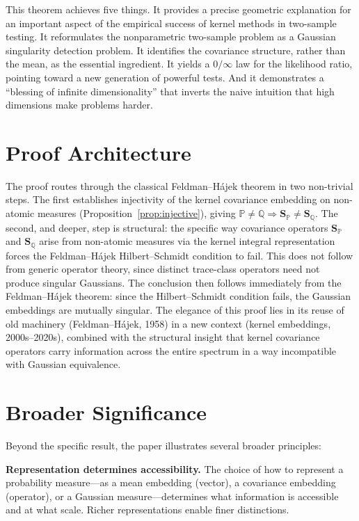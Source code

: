 \documentclass[12pt, oneside]{book}
\theoremstyle{plain}
\theoremstyle{definition}
\newcommand{\PP}{\mathbb{P}}
\newcommand{\QQ}{\mathbb{Q}}
\newcommand{\SP}{\mathbf{S}_{\PP}}
\newcommand{\SQ}{\mathbf{S}_{\QQ}}
\begin{document}
This theorem achieves five things. It provides a precise geometric explanation for an important aspect of the empirical success of kernel methods in two-sample testing. It reformulates the nonparametric two-sample problem as a Gaussian singularity detection problem. It identifies the covariance structure, rather than the mean, as the essential ingredient. It yields a $0/\infty$ law for the likelihood ratio, pointing toward a new generation of powerful tests. And it demonstrates a ``blessing of infinite dimensionality'' that inverts the naive intuition that high dimensions make problems harder.

\section{Proof Architecture}

The proof routes through the classical Feldman--H\'ajek theorem in two non-trivial steps. The first establishes injectivity of the kernel covariance embedding on non-atomic measures (Proposition~\ref{prop:injective}), giving $\PP \neq \QQ \Rightarrow \SP \neq \SQ$. The second, and deeper, step is structural: the specific way covariance operators $\SP$ and $\SQ$ arise from non-atomic measures via the kernel integral representation forces the Feldman--H\'ajek Hilbert--Schmidt condition to fail. This does not follow from generic operator theory, since distinct trace-class operators need not produce singular Gaussians. The conclusion then follows immediately from the Feldman--H\'ajek theorem: since the Hilbert--Schmidt condition fails, the Gaussian embeddings are mutually singular. The elegance of this proof lies in its reuse of old machinery (Feldman--H\'ajek, 1958) in a new context (kernel embeddings, 2000s--2020s), combined with the structural insight that kernel covariance operators carry information across the entire spectrum in a way incompatible with Gaussian equivalence.

\section{Broader Significance}

Beyond the specific result, the paper illustrates several broader principles:

\textbf{Representation determines accessibility.} The choice of how to represent a probability measure---as a mean embedding (vector), a covariance embedding (operator), or a Gaussian measure---determines what information is accessible and at what scale. Richer representations enable finer distinctions.
\end{document}
